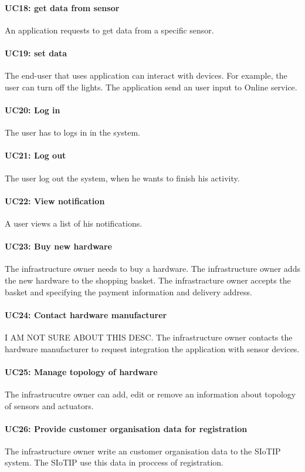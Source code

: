 \paragraph{UC18: get data from sensor}
An application requests to get data from a specific sensor.
\paragraph{UC19: set data}
The end-user that uses application can interact with devices. For example, the user
can turn off the lights. The application send an user input to Online service.
\paragraph{UC20: Log in}
The user has to logs in in the system.
\paragraph{UC21: Log out}
The user log out the system, when he wants to finish his activity.
\paragraph{UC22: View notification}
A user views a list of his notifications.
\paragraph{UC23: Buy new hardware }
The infrastructure owner needs to buy a hardware. The infrastructure
owner adds the new hardware to the shopping basket. The infrastracture owner accepts
the basket and specifying the payment information and delivery address.
\paragraph{UC24: Contact hardware manufacturer}
I AM NOT SURE ABOUT THIS DESC. The infrastructure owner contacts the hardware
manufacturer to request integration the application with sensor devices.
\paragraph{UC25: Manage topology of hardware}
The infrastrucutre owner can add, edit or remove an information about topology
of sensors and actuators.
\paragraph{UC26: Provide customer organisation data for registration}
The infrastructure owner write an customer organisation data to the SIoTIP system.
The SIoTIP use this data in proccess of registration.



